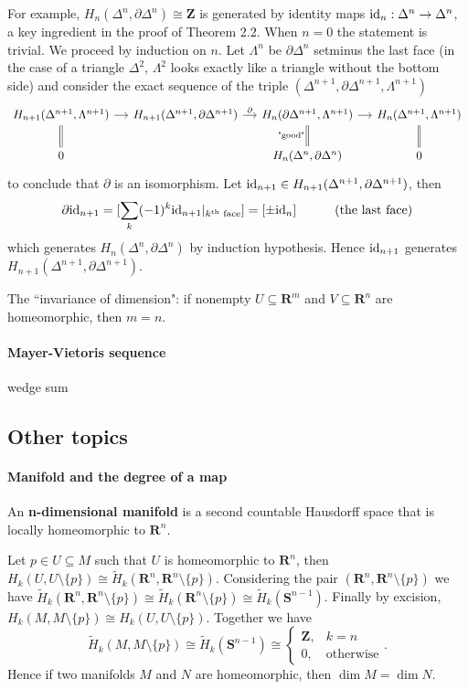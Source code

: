 \documentclass[11pt]{article}
\theoremstyle{definition}
\theoremstyle{plain}
\newcommand{\id}{\textup{id}}
\newcommand{\R}{\mathbf{R}}
\newcommand{\Z}{\mathbf{Z}}
\newcommand{\1}{\mathbf{1}}
\begin{document}
For example, $H_n(\Delta^n,\partial\Delta^n)\cong\Z$ is generated by identity maps $\id_n:\Delta^n\to\Delta^n$, a key ingredient in the proof of Theorem 2.2. When $n=0$ the statement is trivial. We proceed by induction on $n$. Let $\Lambda^n$ be $\partial\Delta^n$ setminus the last face (in the case of a triangle $\Delta^2$, $\Lambda^2$ looks exactly like a triangle without the bottom side) and consider the exact sequence of the triple $(\Delta^{n+1},\partial\Delta^{n+1},\Lambda^{n+1})$
\[\begin{tikzcd}[column sep=small]
H_{n+1}(\Delta^{n+1},\Lambda^{n+1})\arrow[d,equal]\arrow[r]&H_{n+1}(\Delta^{n+1},\partial\Delta^{n+1})\arrow{r}{\partial}&H_n(\partial\Delta^{n+1},\Lambda^{n+1})\arrow[equal,d,"\textrm{"good"}"']\arrow[r]&H_n(\Delta^{n+1},\Lambda^{n+1})\arrow[equal,d]\\
0&&H_n(\Delta^n,\partial\Delta^n)&0
\end{tikzcd}\]
to conclude that $\partial$ is an isomorphism. Let $\id_{n+1}\in H_{n+1}(\Delta^{n+1},\partial\Delta^{n+1})$, then
\begin{align*}
\partial \id_{n+1}=[\sum_k(-1)^k\id_{n+1}|_{k^{\textrm{th}}\textrm{ face}}]=[\pm\id_n]\quad\quad\quad\textrm{(the last face)}
\end{align*}
which generates $H_n(\Delta^n,\partial\Delta^n)$ by induction hypothesis. Hence $\id_{n+1}$ generates $H_{n+1}(\Delta^{n+1},\partial\Delta^{n+1})$.\medbreak

The ``invariance of dimension": if nonempty $U\subseteq\R^m$ and $V\subseteq\R^n$ are homeomorphic, then $m=n$. 

\paragraph{Mayer-Vietoris sequence}

wedge sum

\newpage
\subsection{Other topics}

\paragraph{Manifold and the degree of a map}

An \textbf{n-dimensional manifold} is a second countable Hausdorff space that is locally homeomorphic to $\R^n$.\medbreak

Let $p\in U\subseteq M$ such that $U$ is homeomorphic to $\R^n$, then $H_k(U,U\setminus\{p\})\cong\widetilde{H}_k(\R^n,\R^n\setminus\{p\})$. Considering the pair $(\R^n,\R^n\setminus\{p\})$ we have $\widetilde{H}_k(\R^n,\R^n\setminus\{p\})\cong \widetilde{H}_k(\R^n\setminus\{p\})\cong\widetilde{H}_k(\mathbf{S}^{n-1})$. Finally by excision, $H_k(M,M\setminus\{p\})\cong H_k(U,U\setminus\{p\})$. Together we have 
\[\widetilde{H}_k(M,M\setminus\{p\})\cong\widetilde{H}_k(\mathbf{S}^{n-1})\cong\begin{cases}
\Z,&k=n\\
0,&\textrm{otherwise}
\end{cases}.\]
Hence if two manifolds $M$ and $N$ are homeomorphic, then $\dim M=\dim N$.\medbreak
\end{document}

